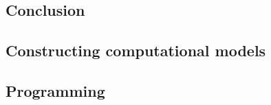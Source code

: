 \documentclass{msuphddissertation}
\begin{document}
\begin{doublespace}
%
%

\chapter{Conclusion}\label{CH7:Conclusion}

%
%

\appendices\label{Appendix}

\section*{Constructing computational models}

\section*{Programming}

%
%

\end{doublespace}



\end{document}
